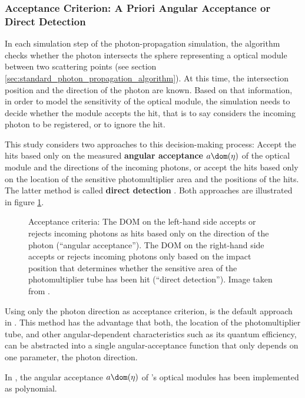 \FloatBarrier
\subsubsection{Acceptance Criterion: A Priori Angular Acceptance or Direct Detection}
\label{sec:acception_criterion}\label{sec:a_priori_angular_acceptance}

In each simulation step of the photon-propagation simulation, the algorithm checks whether the photon intersects the sphere representing a optical module between two scattering points (see section \ref{sec:standard_photon_propagation_algorithm}). At this time, the intersection position and the direction of the photon are known. Based on that information, in order to model the sensitivity of the optical module, the simulation needs to decide whether the module accepts the hit, that is to say considers the incoming photon to be registered, or to ignore the hit.

This study considers two approaches to this decision-making process: Accept the hits based only on the measured \textbf{angular acceptance} $a\dom(\eta)$ of the optical module and the directions of the incoming photons, or accept the hits based only on the location of the sensitive photomultiplier area and the positions of the hits. The latter method is called \textbf{direct detection} \cite{martinspicehddard}. Both approaches are illustrated in figure \ref{fig:kieQuoh1}.

\begin{figure}[htbp]
  \centering
  \caption{Acceptance criteria: The DOM on the left-hand side accepts or rejects incoming photons as hits based only on the direction of the photon (``angular acceptance''). The DOM on the right-hand side accepts or rejects incoming photons only based on the impact position that determines whether the sensitive area of the photomultiplier tube has been hit (``direct detection''). Image taken from \cite[slide 17]{martinspicehddard}.}
  \label{fig:kieQuoh1}
\end{figure}

Using only the photon direction as acceptance criterion, is the default approach in \clsim. This method has the advantage that both, the location of the photomultiplier tube, and other angular-dependent characteristics such as its quantum efficiency, can be abstracted into a single angular-acceptance function that only depends on one parameter, the photon direction.

In \clsim, the angular acceptance $a\dom(\eta)$ of \icecube's optical modules has been implemented as polynomial.

